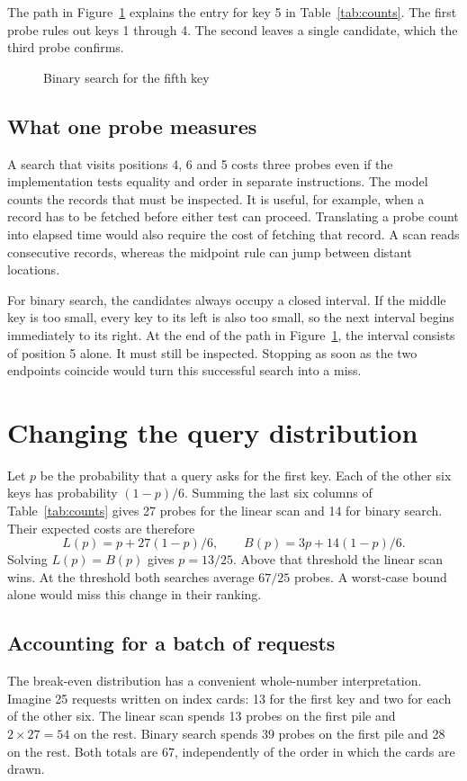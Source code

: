 \documentclass[lang=en]{fduthesis}
\begin{document}
The path in Figure~\ref{fig:path} explains the entry for key 5 in
Table~\ref{tab:counts}. The first probe rules out keys 1 through 4.
The second leaves a single candidate, which the third probe confirms.

\begin{figure}[htbp]
  \centering
  \caption{Binary search for the fifth key}\label{fig:path}
\end{figure}

\section{What one probe measures}
A search that visits positions 4, 6 and 5 costs three probes even if the
implementation tests equality and order in separate instructions. The model
counts the records that must be inspected. It is useful, for example, when a
record has to be fetched before either test can proceed. Translating a probe
count into elapsed time would also require the cost of fetching that record.
A scan reads consecutive records, whereas the midpoint rule can jump between
distant locations.

For binary search, the candidates always occupy a closed interval. If the
middle key is too small, every key to its left is also too small, so the next
interval begins immediately to its right. At the end of the path in
Figure~\ref{fig:path}, the interval consists of position 5 alone. It must
still be inspected. Stopping as soon as the two endpoints coincide would
turn this successful search into a miss.

\chapter{Changing the query distribution}
Let $p$ be the probability that a query asks for the first key. Each of the
other six keys has probability $(1-p)/6$. Summing the last six columns of
Table~\ref{tab:counts} gives 27 probes for the linear scan and 14 for binary
search. Their expected costs are therefore
\begin{equation}
  L(p)=p+27(1-p)/6, \qquad B(p)=3p+14(1-p)/6.
  \label{eq:cost}
\end{equation}
Solving $L(p)=B(p)$ gives $p=13/25$. Above that threshold the linear scan
wins. At the threshold both searches average $67/25$ probes. A worst-case
bound alone would miss this change in their ranking.

\section{Accounting for a batch of requests}
The break-even distribution has a convenient whole-number interpretation.
Imagine 25 requests written on index cards: 13 for the first key and two
for each of the other six. The linear scan spends 13 probes on the first
pile and $2\times27=54$ on the rest. Binary search spends 39 probes on the
first pile and 28 on the rest. Both totals are 67, independently of the order
in which the cards are drawn.
\end{document}
